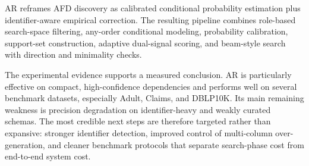 \documentclass[conference]{IEEEtran}
\begin{document}
AR reframes AFD discovery as calibrated conditional probability estimation plus identifier-aware empirical correction. The resulting pipeline combines role-based search-space filtering, any-order conditional modeling, probability calibration, support-set construction, adaptive dual-signal scoring, and beam-style search with direction and minimality checks.

The experimental evidence supports a measured conclusion. AR is particularly effective on compact, high-confidence dependencies and performs well on several benchmark datasets, especially Adult, Claims, and DBLP10K. Its main remaining weakness is precision degradation on identifier-heavy and weakly curated schemas. The most credible next steps are therefore targeted rather than expansive: stronger identifier detection, improved control of multi-column over-generation, and cleaner benchmark protocols that separate search-phase cost from end-to-end system cost.
\end{document}
